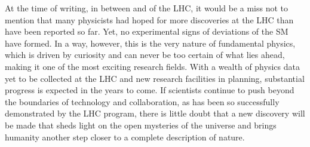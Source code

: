 
At the time of writing, in between \RunTwo and \RunThr of the LHC, it would be a miss not to mention that many physicists had hoped for more discoveries at the LHC than have been reported so far. 
Yet, no experimental signs of deviations of the SM have formed.
In a way, however, this is the very nature of fundamental physics, which is driven by curiosity and can never be too certain of what lies ahead, making it one of the most exciting research fields. 
With a wealth of physics data yet to be collected at the LHC and new research facilities in planning, substantial progress is expected in the years to come. 
If scientists continue to push beyond the boundaries of technology and collaboration, as has been so successfully demonstrated by the LHC program, there is little doubt that a new discovery will be made that sheds light on the open mysteries of the universe and brings humanity another step closer to a complete description of nature. 


